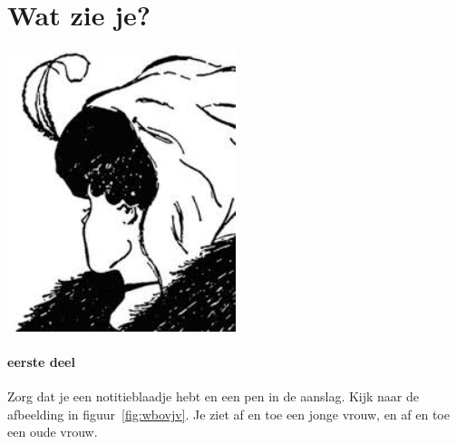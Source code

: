 \documentclass[../../main.tex]{subfiles}
\begin{document}
\onlyinsubfile{
\setcounter{chapter}{0}
}
\notinsubfile{}
\section{Wat zie je?}\label{sec:watzieje}


\begin{center}
\leavevmode\includegraphics[width=0.5\textwidth]{./img/ovjv.png}
\end{center}
\paragraph{eerste deel}Zorg dat je een notitieblaadje hebt en een pen in de aanslag. Kijk naar de afbeelding in figuur~\ref{fig:wbovjv}. Je ziet af en toe een jonge vrouw, en af en toe een oude vrouw. 
%
\end{document}
